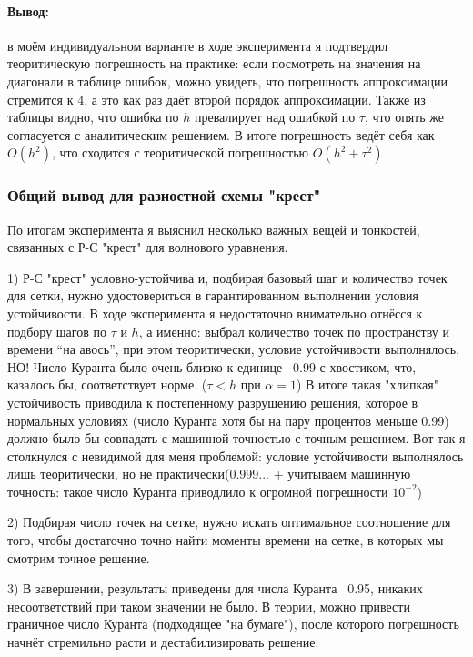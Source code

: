 \documentclass[12pt,a4paper]{article}
\begin{document}
\paragraph{Вывод:}
в моём индивидуальном варианте в ходе эксперимента я подтвердил теоритическую погрешность на практике: если посмотреть на значения на диагонали
в таблице ошибок, можно увидеть, что погрешность аппроксимации стремится к 4, а это как раз даёт второй порядок аппроксимации.
Также из таблицы видно, что ошибка по $h$ превалирует над ошибкой по $\tau$, что опять же согласуется с аналитическим решением. В итоге 
погрешность ведёт себя как $O(h^2)$, что сходится с теоритической погрешностью $O(h^2 + \tau^2)$

\medskip

\subsubsection{Общий вывод для разностной схемы "крест"}

По итогам эксперимента я выяснил несколько важных вещей и тонкостей, связанных с Р-С "крест" для волнового уравнения.

\medskip

1) Р-С "крест" условно-устойчива и, подбирая базовый шаг и количество точек для сетки, нужно удостовериться в гарантированном
выполнении условия устойчивости. В ходе эксперимента я недостаточно внимательно отнёсся к подбору шагов по $\tau$ и $h$, а именно:
выбрал количество точек по пространству и времени ``на авось'', при этом теоритически, условие устойчивости выполнялось, НО!
Число Куранта было очень близко к единице ~0.99 с хвостиком, что, казалось бы, соответствует норме. ($\tau < h $ при $ \alpha = 1$) В итоге такая "хлипкая" 
устойчивость приводила к постепенному разрушению решения, которое в нормальных условиях (число Куранта хотя бы на пару процентов меньше 0.99)
должно было бы совпадать с машинной точностью с точным решением. Вот так я столкнулся с невидимой для меня проблемой: условие устойчивости
выполнялось лишь теоритически, но не практически(0.999... + учитываем машинную точность: такое число Куранта приводлило к огромной погрешности $10^{-2}$)

\medskip

2) Подбирая число точек на сетке, нужно искать оптимальное соотношение для того, чтобы достаточно точно найти моменты времени
на сетке, в которых мы смотрим точное решение. 

\medskip

3) В завершении, результаты приведены для числа Куранта ~0.95, никаких несоответствий при таком значении не было.
В теории, можно привести граничное число Куранта (подходящее "на бумаге"), после которого погрешность начнёт стремильно расти и дестабилизировать решение.
\end{document}
